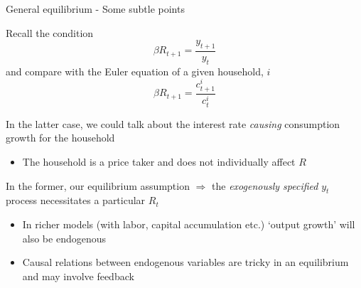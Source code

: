 \begin{frame}{General equilibrium - Some subtle points}

Recall the condition
\begin{equation*}
\beta R_{t+1}=\frac{y_{t+1}}{y_{t}}
\end{equation*}
and compare with the Euler equation of a given household, $i$
\begin{equation*}
\beta R_{t+1}=\frac{c^{i}_{t+1}}{c^{i}_{t}}
\end{equation*}

In the latter case, we could talk about the interest rate \textit{causing} consumption growth for the household
\begin{itemize}
\item	The household is a price taker and does not individually affect $R$
\end{itemize}

\vspace{2mm}
In the former, our equilibrium assumption $\Rightarrow$ the \textit{exogenously specified} $y_{t}$ process necessitates a particular $R_{t}$
\begin{itemize}
\item	In richer models (with labor, capital accumulation etc.) `output growth' will also be endogenous
\item	Causal relations between endogenous variables are tricky in an equilibrium and may involve feedback
\end{itemize}
\end{frame}
